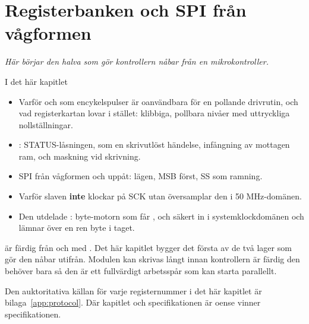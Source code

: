 
\chapter{Registerbanken och SPI från vågformen}
\label{c18:ch}

{\large\itshape Här börjar den halva som gör kontrollern nåbar från en mikrokontroller.\par}

\begin{chapterbox}{I det här kapitlet}
\begin{itemize}
  \item Varför  och  som encykelspulser är oanvändbara för en pollande
    drivrutin, och vad registerkartan lovar i stället: klibbiga, pollbara nivåer med uttryckliga
    nollställningar.
  \item {}: STATUS-låsningen,  som en skrivutlöst händelse,
    infångning av mottagen ram, och maskning vid skrivning.
  \item SPI från vågformen och uppåt: lägen, MSB först, SS som ramning.
  \item Varför slaven \textbf{inte} klockar på SCK utan översamplar den i 50 MHz-domänen.
  \item Den utdelade : byte-motorn som får ,  och 
    säkert in i systemklockdomänen och lämnar över en ren byte i taget.
\end{itemize}
\end{chapterbox}

 är färdig från och med . Det här kapitlet bygger det första av
de två lager som gör den nåbar utifrån. Modulen kan skrivas långt innan kontrollern är färdig
\textemdash{} den behöver bara  \textemdash{} så den är ett fullvärdigt arbetsspår som
kan starta parallellt.

Den auktoritativa källan för varje registernummer i det här kapitlet är bilaga~\ref{app:protocol}.
Där kapitlet och specifikationen är oense vinner specifikationen.






